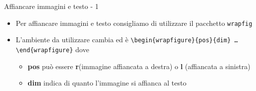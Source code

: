 \begin{frame}{Affiancare immagini e testo - 1}

\begin{itemize}
	\item Per affiancare immagini e testo consigliamo di utilizzare il pacchetto 
	\texttt{wrapfig}
	\item L'ambiente da utilizzare cambia ed è
	\texttt{\textbackslash{}begin\{wrapfigure\}\{pos\}\{dim\}
	\dots{}\textbackslash{}end\{wrapfigure\}} dove
	\begin{itemize}
		\item \textbf{pos} può essere \textbf{r}(immagine affiancata a destra)
		o \textbf{l} (affiancata a sinistra)
		\item \textbf{dim} indica di quanto l'immagine si affianca al testo
	\end{itemize}
\end{itemize}

\end{frame}
